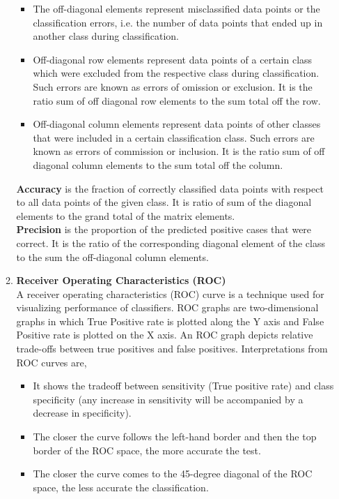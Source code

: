 \documentclass[11pt,paper=a4,answers]{exam}
\begin{document}
\begin{questions}
\begin{enumerate}[i.]
\begin{enumerate}
\begin{itemize}
                        \item The off-diagonal elements represent misclassified data points or the classification errors, i.e. the number of data points that ended up in another class during classification. 
                        \item Off-diagonal row elements represent data points of a certain class which were excluded from the respective class during classification. Such errors are known as errors of omission or exclusion. It is the ratio sum of off diagonal row elements to the sum total off the row.
                        \item Off-diagonal column elements represent data points of other classes that were included in a certain classification class. Such errors are known as errors of commission or inclusion. It is the ratio sum of off diagonal column elements to the sum total off the column.
                    \end{itemize}
                    
                    \textbf{Accuracy} is the fraction of correctly classified data points with respect to all data points of the given class. It is ratio of sum of the diagonal elements to the grand total of the matrix elements.\\
                    \textbf{Precision} is the proportion of the predicted positive cases that were correct. It is the ratio of the corresponding diagonal element of the class to the sum the off-diagonal column elements.
                \item \textbf{Receiver Operating Characteristics (ROC)}\\
                    A receiver operating characteristics (ROC) curve is a technique used for visualizing performance of classifiers. ROC graphs are two-dimensional graphs in which True Positive rate is plotted along the Y axis and False Positive rate is plotted on the X axis. An ROC graph depicts relative trade-offs between true positives and false positives. Interpretations from ROC curves are,
                    \begin{itemize}
                        \item It shows the tradeoff between sensitivity (True positive rate) and class specificity (any increase in sensitivity will be accompanied by a decrease in specificity).
                        \item The closer the curve follows the left-hand border and then the top border of the ROC space, the more accurate the test.
                        \item The closer the curve comes to the 45-degree diagonal of the ROC space, the less accurate the classification.
                    \end{itemize}
            \end{enumerate}
                

\end{enumerate}
\end{questions}
\end{document}
